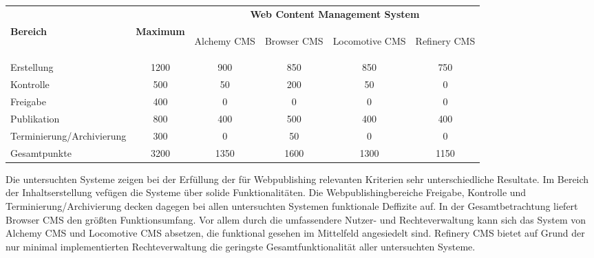 \begin{table}[!h]
\renewcommand{\arraystretch}{1.5}
\center
\begin{tabular}{|l|c|c|c|c|c|}
\hline
& & \multicolumn{4}{c|}{\textbf{Web Content Management System}} \\[2pt]
\cline{3-6}
\textbf{Bereich}& \textbf{Maximum} &
\begin{sideways}
\parbox[c][1cm][c]{4cm}{Alchemy CMS}
\end{sideways}
&\begin{sideways}
\parbox[c][1cm][c]{4cm}{Browser CMS}
\end{sideways}
&\begin{sideways}
\parbox[c][1cm][c]{4cm}{Locomotive CMS}
\end{sideways}
&\begin{sideways}
\parbox[c][1cm][c]{4cm}{Refinery CMS}
\end{sideways} \\
\hline
Erstellung & 1200 & 900 & 850 & 850 & 750 \\
\hline
Kontrolle & 500 & 50 & 200 & 50 & 0 \\
\hline
Freigabe & 400 & 0 & 0 & 0 & 0 \\
\hline
Publikation & 800 & 400 & 500 & 400 & 400 \\
\hline
Terminierung/Archivierung & 300 & 0 & 50 & 0 & 0 \\
\hline
\hline
Gesamtpunkte & 3200 & 1350 & 1600 & 1300 & 1150 \\
\hline
\end{tabular}
\end{table}


Die untersuchten Systeme zeigen bei der Erfüllung der für Webpublishing relevanten Kriterien sehr unterschiedliche Resultate. Im Bereich der Inhaltserstellung vefügen die Systeme über solide Funktionalitäten. Die Webpublishingbereiche Freigabe, Kontrolle und Terminierung/Archivierung decken dagegen bei allen untersuchten Systemen funktionale Deffizite auf. In der Gesamtbetrachtung liefert Browser CMS den größten Funktionsumfang. Vor allem durch die umfassendere Nutzer- und Rechteverwaltung kann sich das System von Alchemy CMS und Locomotive CMS absetzen, die funktional gesehen im Mittelfeld angesiedelt sind. Refinery CMS bietet auf Grund der nur minimal implementierten Rechteverwaltung die geringste Gesamtfunktionalität aller untersuchten Systeme.

